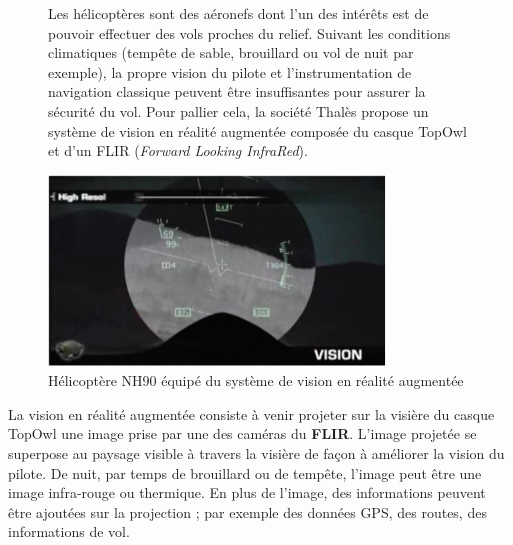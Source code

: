 \begin{figure}[!htb]
\begin{center}
\begin{minipage}{0.45\textwidth}
Les hélicoptères sont des aéronefs dont l'un des intérêts
est de pouvoir effectuer des vols proches du relief. Suivant
les conditions climatiques (tempête de sable, brouillard
ou vol de nuit par exemple), la propre vision du pilote
et l'instrumentation de navigation classique peuvent être
insuffisantes pour assurer la sécurité du vol. Pour pallier
cela, la société Thalès propose un système de vision en
réalité augmentée composée du casque TopOwl et d'un
FLIR (\textit{Forward Looking InfraRed}).
\end{minipage}
\begin{minipage}{0.45\textwidth}
\begin{center}
\includegraphics[width=0.8\textwidth]{images/figure2.jpg}
\caption{Hélicoptère NH90 équipé du système de vision en réalité augmentée\label{fig2}}
\end{center}
\end{minipage}
\end{center}
\end{figure}

\FloatBarrier
La vision en réalité augmentée consiste à venir projeter
sur la visière du casque TopOwl une image prise par une
des caméras du \textbf{FLIR}. L'image projetée se superpose au
paysage visible à travers la visière de façon à améliorer
la vision du pilote. De nuit, par temps de brouillard ou
de tempête, l'image peut être une image infra-rouge ou
thermique. En plus de l'image, des informations peuvent être ajoutées sur la projection ; par exemple des données
GPS, des routes, des informations de vol.


